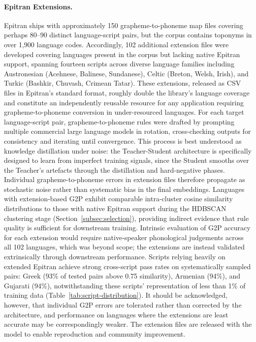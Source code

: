 \documentclass[11pt,a4paper]{article}
\begin{document}
\paragraph{Epitran Extensions.} Epitran ships with approximately 150 grapheme-to-phoneme map files covering perhaps 80--90 distinct language-script pairs, but the corpus contains toponyms in over 1,900 language codes. Accordingly, 102 additional extension files were developed covering languages present in the corpus but lacking native Epitran support, spanning fourteen scripts across diverse language families including Austronesian (Acehnese, Balinese, Sundanese), Celtic (Breton, Welsh, Irish), and Turkic (Bashkir, Chuvash, Crimean Tatar). These extensions, released as CSV files in Epitran's standard format, roughly double the library's language coverage and constitute an independently reusable resource for any application requiring grapheme-to-phoneme conversion in under-resourced languages. For each target language-script pair, grapheme-to-phoneme rules were drafted by prompting multiple commercial large language models in rotation, cross-checking outputs for consistency and iterating until convergence. This process is best understood as knowledge distillation under noise: the Teacher-Student architecture is specifically designed to learn from imperfect training signals, since the Student smooths over the Teacher's artefacts through the distillation and hard-negative phases. Individual grapheme-to-phoneme errors in extension files therefore propagate as stochastic noise rather than systematic bias in the final embeddings. Languages with extension-based G2P exhibit comparable intra-cluster cosine similarity distributions to those with native Epitran support during the HDBSCAN clustering stage (Section~\ref{subsec:selection}), providing indirect evidence that rule quality is sufficient for downstream training. Intrinsic evaluation of G2P accuracy for each extension would require native-speaker phonological judgements across all 102 languages, which was beyond scope; the extensions are instead validated extrinsically through downstream performance. Scripts relying heavily on extended Epitran achieve strong cross-script pass rates on systematically sampled pairs: Greek (93\% of tested pairs above 0.75 similarity), Armenian (94\%), and Gujarati (94\%), notwithstanding these scripts' representation of less than 1\% of training data (Table~\ref{tab:script-distribution}). It should be acknowledged, however, that individual G2P errors are tolerated rather than corrected by the architecture, and performance on languages where the extensions are least accurate may be correspondingly weaker. The extension files are released with the model to enable reproduction and community improvement.
\end{document}
